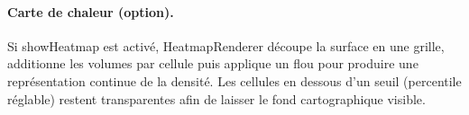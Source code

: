 \paragraph{Carte de chaleur (option).}
Si showHeatmap est activé, HeatmapRenderer découpe la surface en une grille, additionne les volumes par cellule puis applique un flou pour produire une représentation continue de la densité. Les cellules en dessous d’un seuil (percentile réglable) restent transparentes afin de laisser le fond cartographique visible.
